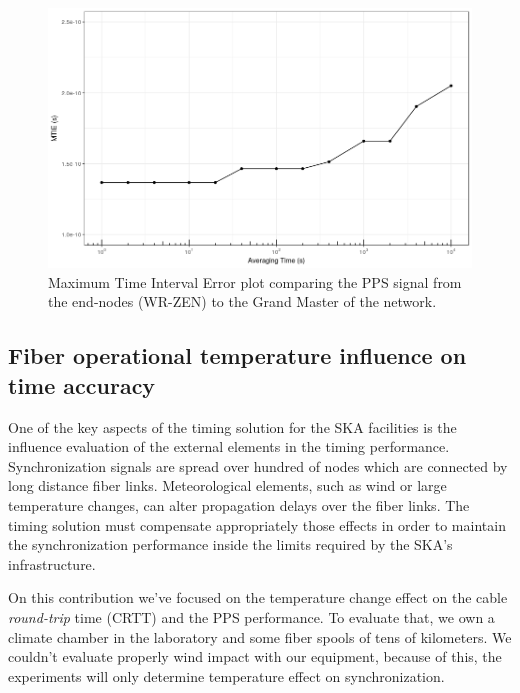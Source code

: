 \begin{figure}
	\centering
	\includegraphics[width=0.9\linewidth]{img/MTIE_exp3}
	\caption[MTIE of the end-nodes in the scalability test.]{Maximum Time 
	Interval Error
	plot comparing the PPS signal from the end-nodes (WR-ZEN) to the Grand 
	Master of the network.}
	\label{fig:mtienet}
\end{figure}

\subsection{Fiber operational temperature influence on time accuracy}
\label{subsec:temp}

One of the key aspects of the timing solution for the SKA facilities is the 
influence evaluation of the external elements in the timing performance. 
Synchronization signals are spread over hundred of nodes which are connected by 
long distance fiber links. Meteorological elements, such as wind or large 
temperature changes, can alter propagation delays over the fiber 
links. The timing solution must compensate appropriately those effects in order 
to maintain the synchronization performance inside the limits required by the 
SKA's infrastructure.

On this contribution we've focused on the temperature change effect on the cable
\textit{round-trip} time (CRTT) and the PPS performance. To evaluate that, we 
own a climate chamber in the laboratory and some fiber spools of tens of 
kilometers. 
We couldn't evaluate properly wind impact with our equipment, because of this, 
the experiments will only determine temperature effect on synchronization.


